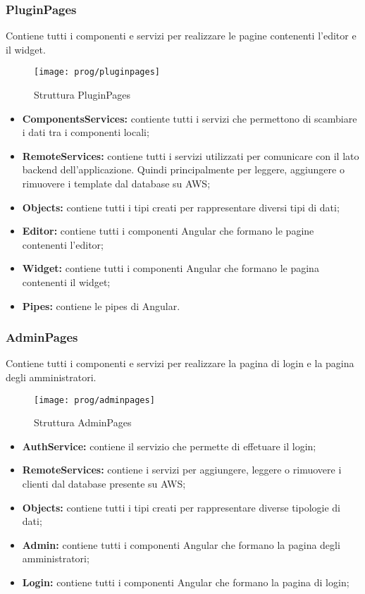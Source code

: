 \subsubsection{PluginPages}
Contiene tutti i componenti e servizi per realizzare le pagine contenenti l'editor e il widget.
\begin{figure}[!h] 
	\centering 
	\texttt{[image: prog/pluginpages]} 
	\caption{Struttura PluginPages}
\end{figure}
\begin{itemize}
	\item \textbf{ComponentsServices:} contiente tutti i servizi che permettono di scambiare i dati tra i componenti locali;
	\item \textbf{RemoteServices:} contiene tutti i servizi utilizzati per comunicare con il lato backend dell'applicazione. Quindi principalmente per leggere, aggiungere o rimuovere i template dal database su AWS;
	\item \textbf{Objects:} contiene tutti i tipi creati per rappresentare diversi tipi di dati;
	\item \textbf{Editor:} contiene tutti i componenti Angular che formano le pagine contenenti l'editor;
	\item \textbf{Widget:} contiene tutti i componenti Angular che formano le pagina contenenti il widget;
	\item \textbf{Pipes:} contiene le pipes di  Angular.
\end{itemize}
\newpage
\subsubsection{AdminPages}
Contiene tutti i componenti e servizi per realizzare la pagina di login e la pagina degli amministratori.
\begin{figure}[!h] 
	\centering 
	\texttt{[image: prog/adminpages]} 
	\caption{Struttura AdminPages}
\end{figure}
\begin{itemize}
	\item \textbf{AuthService:} contiene il servizio che permette di effetuare il login;
	\item \textbf{RemoteServices:} contiene i servizi per aggiungere, leggere o rimuovere i clienti dal database presente su AWS;
	\item \textbf{Objects:} contiene tutti i tipi creati per rappresentare diverse tipologie di dati;
	\item \textbf{Admin:} contiene tutti i componenti Angular che formano la pagina degli amministratori;
	\item \textbf{Login:} contiene tutti i componenti Angular che formano la pagina di login;
\end{itemize}

